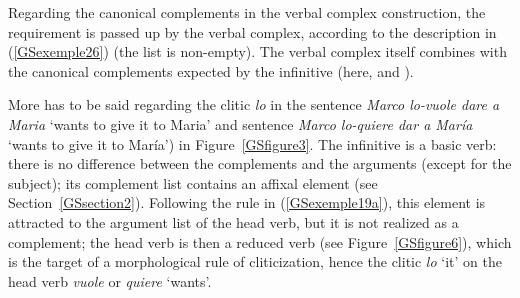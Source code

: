 \largerpage[2]
Regarding the canonical complements in the verbal complex construction, the requirement is passed up
by the verbal complex, according to the description in (\ref{GSexemple26}) (the list  is
non-empty). The verbal complex itself combines with the canonical complements expected by the
infinitive (here,  and ).

More has to be said regarding the clitic \emph{lo} in the  sentence \emph{Marco lo-vuole dare a Maria} `wants to give it to Maria' and  sentence \emph{Marco lo-quiere dar a Mar\'ia} `wants to give it to Mar\'ia') in Figure~\ref{GSfigure3}. The infinitive is a basic verb: there is no difference between the complements and the arguments (except for the subject); its complement list contains an affixal element (see Section~\ref{GSsection2}). Following the rule in (\ref{GSexemple19a}), this element is attracted to the argument list of the head verb, but it is not realized as a complement; the head verb is then a reduced verb (see Figure~\ref{GSfigure6}), which is the target of a morphological rule of cliticization, hence the clitic \emph{lo} `it' on the head verb \emph{vuole} or \emph{quiere} `wants'. 



